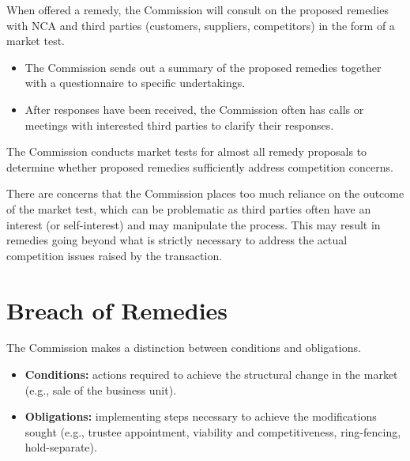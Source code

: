             When offered a remedy, the Commission will consult on the proposed remedies with NCA and third parties (customers, suppliers, competitors) in the form of a market test.
            \begin{itemize}
                \item The Commission sends out a summary of the proposed remedies together with a questionnaire to specific undertakings.
                \item After responses have been received, the Commission often has calls or meetings with interested third parties to clarify their responses.
            \end{itemize}
            
            The Commission conducts market tests for almost all remedy proposals to determine whether proposed remedies sufficiently address competition concerns.
            
            There are concerns that the Commission places too much reliance on the outcome of the market test, which can be problematic as third parties often have an interest (or self-interest) and may manipulate the process. This may result in remedies going beyond what is strictly necessary to address the actual competition issues raised by the transaction.

\section{Breach of Remedies}

    The Commission makes a distinction between conditions and obligations.
    \begin{itemize}
        \item \textbf{Conditions:} actions required to achieve the structural change in the market (e.g., sale of the business unit).
        \item \textbf{Obligations:} implementing steps necessary to achieve the modifications sought (e.g., trustee appointment, viability and competitiveness, ring-fencing, hold-separate).
    \end{itemize}
    
